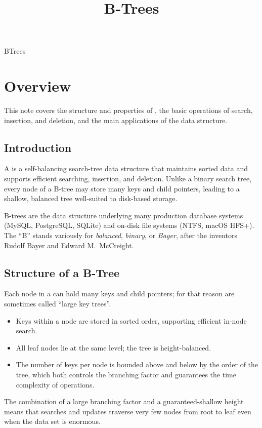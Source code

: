 \documentclass[hidelinks]{article}
\title{B-Trees}
\author{}
\date{}
\begin{document}
\maketitle

\begin{smodule}[title={B-Trees}]{BTrees}


\section{Overview}

This note covers the structure and properties of , the basic operations of search, insertion, and deletion, and the main applications of the data structure.

\subsection{Introduction}

\begin{sdefinition}[for=B-tree]
    A  is a self-balancing search-tree data structure that maintains sorted data and supports efficient searching, insertion, and deletion. Unlike a binary search tree, every node of a B-tree may store many keys and child pointers, leading to a shallow, balanced tree well-suited to disk-based storage.
\end{sdefinition}

B-trees are the data structure underlying many production database systems (MySQL, PostgreSQL, SQLite) and on-disk file systems (NTFS, macOS HFS+). The ``B'' stands variously for \emph{balanced}, \emph{binary}, or \emph{Bayer}, after the inventors Rudolf Bayer and Edward M.~McCreight.

\subsection{Structure of a B-Tree}

Each node in a  can hold many keys and child pointers; for that reason  are sometimes called ``large key trees''.
\begin{itemize}
  \item Keys within a node are stored in sorted order, supporting efficient in-node search.
  \item All leaf nodes lie at the same level; the tree is height-balanced.
  \item The number of keys per node is bounded above and below by the order of the tree, which both controls the branching factor and guarantees the time complexity of operations.
\end{itemize}
The combination of a large branching factor and a guaranteed-shallow height means that searches and updates traverse very few nodes from root to leaf even when the data set is enormous.


\end{smodule}
\end{document}
